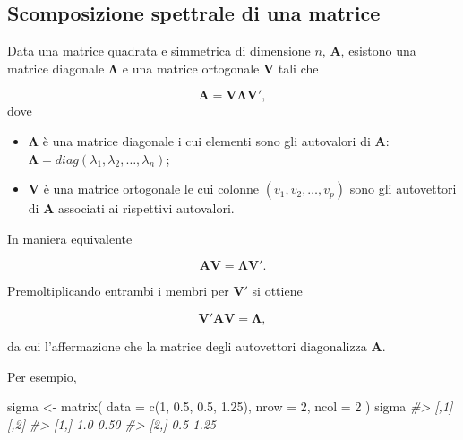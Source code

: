 \documentclass[
  11pt,
]{krantz}
\makeatletter
\newenvironment{Shaded}{\begin{snugshade}}{\end{snugshade}}
\newcommand{\AttributeTok}[1]{\textcolor[rgb]{0.61,0.61,0.61}{#1}}
\newcommand{\CommentTok}[1]{\textcolor[rgb]{0.37,0.37,0.37}{\textit{#1}}}
\newcommand{\DecValTok}[1]{\textcolor[rgb]{0.06,0.06,0.06}{#1}}
\newcommand{\FloatTok}[1]{\textcolor[rgb]{0.06,0.06,0.06}{#1}}
\newcommand{\FunctionTok}[1]{\textcolor[rgb]{0,0,0}{#1}}
\newcommand{\NormalTok}[1]{#1}
\newcommand{\OtherTok}[1]{\textcolor[rgb]{0.37,0.37,0.37}{#1}}
\providecommand{\tightlist}{%
  \setlength{\itemsep}{0pt}\setlength{\parskip}{0pt}}
\newenvironment{kframe}{%
\medskip{}
\setlength{\fboxsep}{.8em}
 \def\at@end@of@kframe{}%
 \ifinner\ifhmode%
  \def\at@end@of@kframe{\end{minipage}}%
  \begin{minipage}{\columnwidth}%
 \fi\fi%
 \def\FrameCommand##1{\hskip\@totalleftmargin \hskip-\fboxsep
 \colorbox{shadecolor}{##1}\hskip-\fboxsep
     \hskip-\linewidth \hskip-\@totalleftmargin \hskip\columnwidth}%
 \MakeFramed {\advance\hsize-\width
   \@totalleftmargin\z@ \linewidth\hsize
   \@setminipage}}%
 {\par\unskip\endMakeFramed%
 \at@end@of@kframe}
\renewenvironment{Shaded}{\begin{kframe}}{\end{kframe}}
\theoremstyle{definition}
\theoremstyle{definition}
\theoremstyle{definition}
\theoremstyle{definition}
\theoremstyle{remark}
\makeatother
\begin{document}
\hypertarget{scomposizione-spettrale-di-una-matrice}{%
\subsection{Scomposizione spettrale di una matrice}\label{scomposizione-spettrale-di-una-matrice}}

Data una matrice quadrata e simmetrica di dimensione \(n\), \(\boldsymbol{A}\), esistono una matrice diagonale \(\boldsymbol{\Lambda}\) e una matrice ortogonale \(\boldsymbol{V}\) tali che

\[\boldsymbol{A} =\boldsymbol{V} \boldsymbol{\Lambda} \boldsymbol{V}',\] dove

\begin{itemize}
\tightlist
\item
  \(\boldsymbol{\Lambda}\) è una matrice diagonale i cui elementi sono gli autovalori di \(\boldsymbol{A}\): \(\boldsymbol{\Lambda} = diag(\lambda_1, \lambda_2,  \dots, \lambda_n)\);
\item
  \(\boldsymbol{V}\) è una matrice ortogonale le cui colonne \((v_1, v_2, \dots, v_p)\) sono gli autovettori di \(\boldsymbol{A}\) associati ai rispettivi autovalori.
\end{itemize}

In maniera equivalente

\[\boldsymbol{A} \boldsymbol{V} =  \boldsymbol{\Lambda} \boldsymbol{V}'.\]

Premoltiplicando entrambi i membri per \(\boldsymbol{V}'\) si ottiene

\[\boldsymbol{V}'\boldsymbol{A} \boldsymbol{V} =
\boldsymbol{\Lambda},\]

da cui l'affermazione che la matrice degli autovettori diagonalizza \(\boldsymbol{A}\).

Per esempio,

\begin{Shaded}
\begin{Highlighting}[]
\NormalTok{sigma }\OtherTok{\textless{}{-}} \FunctionTok{matrix}\NormalTok{(}
  \AttributeTok{data =} \FunctionTok{c}\NormalTok{(}\DecValTok{1}\NormalTok{, }\FloatTok{0.5}\NormalTok{, }\FloatTok{0.5}\NormalTok{, }\FloatTok{1.25}\NormalTok{),}
  \AttributeTok{nrow =} \DecValTok{2}\NormalTok{,}
  \AttributeTok{ncol =} \DecValTok{2}
\NormalTok{)}
\NormalTok{sigma}
\CommentTok{\#\textgreater{}      [,1] [,2]}
\CommentTok{\#\textgreater{} [1,]  1.0 0.50}
\CommentTok{\#\textgreater{} [2,]  0.5 1.25}
\end{Highlighting}
\end{Shaded}
\end{document}
